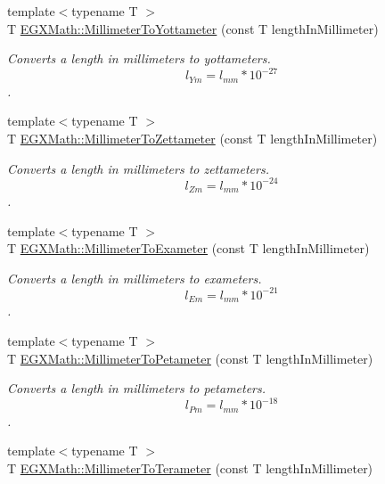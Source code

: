 \begin{DoxyCompactItemize}
{\footnotesize template$<$typename T $>$ }\\T \mbox{\hyperlink{group___e_g_x_math-_conversions-_length_conversions-_s_i-_millimeter-_s_i_ga0c63bb9317c6f47942e00d23d0bf9762}{E\+G\+X\+Math\+::\+Millimeter\+To\+Yottameter}} (const T length\+In\+Millimeter)
\begin{DoxyCompactList}\small\item\em Converts a length in millimeters to yottameters. \[ l_{Ym}=l_{mm} * 10^{-27} \]. \end{DoxyCompactList}\item 
{\footnotesize template$<$typename T $>$ }\\T \mbox{\hyperlink{group___e_g_x_math-_conversions-_length_conversions-_s_i-_millimeter-_s_i_ga06531acdd75d87de598010df5c9536f5}{E\+G\+X\+Math\+::\+Millimeter\+To\+Zettameter}} (const T length\+In\+Millimeter)
\begin{DoxyCompactList}\small\item\em Converts a length in millimeters to zettameters. \[ l_{Zm}=l_{mm} * 10^{-24} \]. \end{DoxyCompactList}\item 
{\footnotesize template$<$typename T $>$ }\\T \mbox{\hyperlink{group___e_g_x_math-_conversions-_length_conversions-_s_i-_millimeter-_s_i_gaceb47f60171d86e6d552801e9a552530}{E\+G\+X\+Math\+::\+Millimeter\+To\+Exameter}} (const T length\+In\+Millimeter)
\begin{DoxyCompactList}\small\item\em Converts a length in millimeters to exameters. \[ l_{Em}=l_{mm} * 10^{-21} \]. \end{DoxyCompactList}\item 
{\footnotesize template$<$typename T $>$ }\\T \mbox{\hyperlink{group___e_g_x_math-_conversions-_length_conversions-_s_i-_millimeter-_s_i_ga02c5ee4941d1915c4d6d2b96788bb89f}{E\+G\+X\+Math\+::\+Millimeter\+To\+Petameter}} (const T length\+In\+Millimeter)
\begin{DoxyCompactList}\small\item\em Converts a length in millimeters to petameters. \[ l_{Pm}=l_{mm} * 10^{-18} \]. \end{DoxyCompactList}\item 
{\footnotesize template$<$typename T $>$ }\\T \mbox{\hyperlink{group___e_g_x_math-_conversions-_length_conversions-_s_i-_millimeter-_s_i_ga0bd88917339b280d5df05adfddc6661a}{E\+G\+X\+Math\+::\+Millimeter\+To\+Terameter}} (const T length\+In\+Millimeter)

\end{DoxyCompactItemize}
